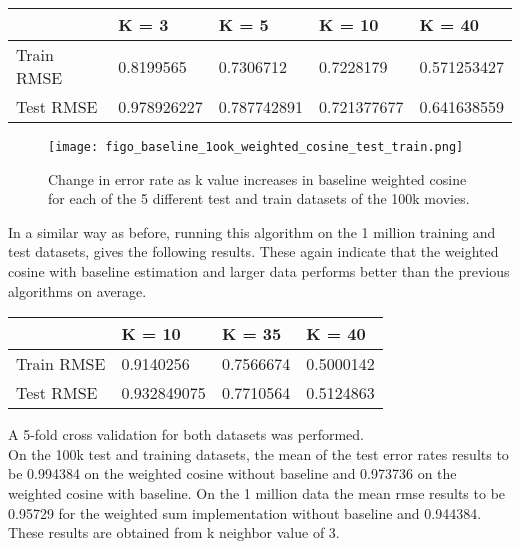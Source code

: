 \documentclass[a4paper]{article}
\begin{document}
\begin{center}
    \begin{tabular}{| l | l | l | l | l|}
    \hline
    & K = 3 & K = 5 & K = 10 & K = 40  \\ \hline
    Train RMSE &  0.8199565 & 0.7306712 & 0.7228179 & 0.571253427  \\ \hline
    Test RMSE & 0.978926227 & 0.787742891 & 0.721377677 & 0.641638559  \\ \hline
    \hline
    \end{tabular}
\end{center}

\begin{figure}
\centering
\texttt{[image: figo\_baseline\_1ook\_weighted\_cosine\_test\_train.png]}
\caption{\label{fig:data}Change in error rate as k value increases in baseline weighted cosine for each of the 5 different test and train datasets of the 100k movies.}
\end{figure}
In a similar way as before, running this algorithm on the 1 million training and test datasets, gives the following results. These again indicate that the weighted cosine with baseline estimation and larger data performs better than the previous algorithms on average. 
\begin{center}
    \begin{tabular}{| l | l | l |l |}
    \hline
     & K = 10 & K = 35 & K = 40  \\ \hline
    Train RMSE &  0.9140256 & 0.7566674 & 0.5000142   \\ \hline
    Test RMSE & 0.932849075 & 0.7710564 & 0.5124863   \\ \hline
    \hline
    \end{tabular}
\end{center}

A 5-fold cross validation for both datasets was performed. \\On the 100k test and training datasets, the mean of the test error rates results to be 0.994384 on the weighted cosine without baseline and  0.973736 on the weighted cosine with baseline. On the 1 million data the mean rmse results to be 0.95729 for the weighted sum implementation without baseline and 0.944384. These results are obtained from k neighbor value of 3. 
\end{document}
